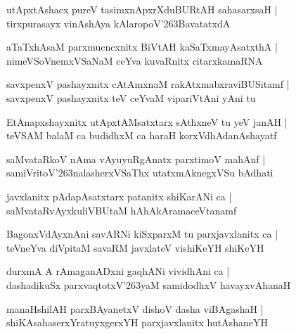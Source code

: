 \documentclass[twoside,12pt,openright]{book}
\def\S{\char'263}
\newcounter{shloka}[chapter]
\begin{document}
\begin{shloka}
utApxtAshacx pureV tasimxnApxrXduBURtAH sahasarxsaH |\\
tirxpurasayx vinAshAya kAlaropoV\S BavatatxdA
\end{shloka}

\begin{shloka}
aTaTxhAsaM parxmucncxnitx BiVtAH kaSaTxmayAsatxthA |\\
nimeVSoVnemxVSaNaM ceYva kuvaRnitx citarxkamaRNA 
\end{shloka}

\begin{shloka}
savxpenxV pashayxnitx cAtAmxnaM rakAtxmabxraviBUSitamf |\\
savxpenxV pashayxnitx teV ceYvaM vipariVtAni yAni tu
\end{shloka}

\begin{shloka}
EtAnapxshayxnitx utApxtAMsatxtarx sAthxneV tu yeV janAH |\\
teVSAM balaM ca budidhxM ca haraH  korxVdhAdanAshayatf
\end{shloka}

\begin{shloka}
saMvataRkoV nAma vAyuyuRgAnatx parxtimoV mahAnf |\\
samiVritoV\S nalasherxVSaThx utatxmAknegxVSu bAdhati
\end{shloka}

\begin{shloka}
javxlanitx pAdapAsatxtarx patanitx shiKarANi ca |\\
saMvataRvAyxkuliVBUtaM hAhAkAramaceVtanamf 
\end{shloka}

\begin{shloka}
BagonxVdAyxnAni savARNi kiSxparxM tu parxjavxlanitx ca |\\
teVneYva diVpitaM savaRM javxlateV vishiKeYH shiKeYH
\end{shloka}

\begin{shloka}
durxmA A rAmaganADxni gaqhANi vividhAni ca |\\
dashadikuSx parxvaqtotxV\S yaM samidodhxV havayxvAhanaH 
\end{shloka}

\begin{shloka}
manaHshilAH parxBAyanetxV dishoV dasha viBAgashaH |\\
shiKAsahaserxYratuyxgerxYH parxjavxlanitx hutAshaneYH 
\end{shloka}
\end{document}

